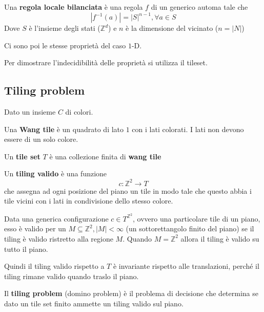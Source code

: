 \begin{definizione} 
    Una \textbf{regola locale bilanciata} è una regola $f$ di un generico automa 
    tale che 
    $$|f^{-1}(a)| = | S | ^{n-1}, \forall a \in S$$
    Dove $S$ è l'insieme degli stati ($\mathbb{Z}^d$) e $n$ è la dimensione del 
    vicinato ($n=|N|$)
\end{definizione}

Ci sono poi le stesse proprietà del caso $1$-D.

Per dimostrare l'indecidibilità delle proprietà si utilizza il tileset.
\subsection{Tiling problem }
Dato un insieme $C$ di colori.

\begin{definizione} 
    Una \textbf{Wang tile} è un quadrato di lato $1$ con i lati colorati. 
    I lati non devono essere di un solo colore.
\end{definizione}

\begin{definizione} 
    Un  \textbf{tile set} $T$ è una collezione finita di \textbf{wang tile}
\end{definizione}

\begin{definizione} 
    Un  \textbf{tiling valido} è una funzione 
    $$c: \mathbb{Z}^2\rightarrow T$$
    che assegna ad ogni posizione del piano un tile in modo tale che questo abbia
    i tile vicini con i lati in condivisione dello stesso colore.
\end{definizione}

Data una generica configurazione $c\in T^{\mathbb{Z}^2}$, ovvero una particolare 
tile di un piano, esso è valido per un $M\subseteq \mathbb{Z}^2, |M|<\infty$ (un sottorettangolo finito
del piano) se il tiling è valido ristretto alla regione $M$. Quando $M=\mathbb{Z}^2$ 
allora il tiling è valido su tutto il piano.

Quindi il tiling valido rispetto a $T$ è invariante rispetto alle translazioni,
perché il tiling rimane valido quando traslo il piano.

\begin{definizione} 
    Il \textbf{tiling problem} (domino problem) è il problema di decisione che determina se dato un 
    tile set finito ammette un tiling valido sul piano.
\end{definizione}

